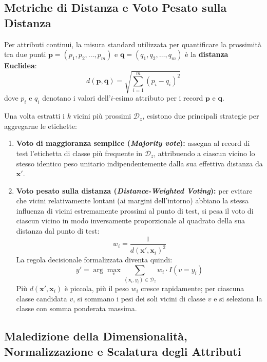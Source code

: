 \FloatBarrier
\subsection{Metriche di Distanza e Voto Pesato sulla Distanza}
\label{subsec:dm-knn-distance-weighting}

Per attributi continui, la misura standard utilizzata per quantificare la prossimit\`a tra due punti $\mathbf{p} = (p_1, p_2, \dots, p_m)$ e $\mathbf{q} = (q_1, q_2, \dots, q_m)$ \`e la \textbf{distanza Euclidea}:
\begin{equation}
    d(\mathbf{p}, \mathbf{q}) = \sqrt{\sum_{i=1}^{m} (p_i - q_i)^2}
\end{equation}
dove $p_i$ e $q_i$ denotano i valori dell'$i$-esimo attributo per i record $\mathbf{p}$ e $\mathbf{q}$.

Una volta estratti i $k$ vicini pi\`u prossimi $\mathcal{D}_z$, esistono due principali strategie per aggregarne le etichette:
\begin{enumerate}
    \item \textbf{Voto di maggioranza semplice (\textit{Majority vote}):} assegna al record di test l'etichetta di classe pi\`u frequente in $\mathcal{D}_z$, attribuendo a ciascun vicino lo stesso identico peso unitario indipendentemente dalla sua effettiva distanza da $\mathbf{x}'$.
    \item \textbf{Voto pesato sulla distanza (\textit{Distance-Weighted Voting}):} per evitare che vicini relativamente lontani (ai margini dell'intorno) abbiano la stessa influenza di vicini estremamente prossimi al punto di test, si pesa il voto di ciascun vicino in modo inversamente proporzionale al quadrato della sua distanza dal punto di test:
    \begin{equation}
        w_i = \frac{1}{d(\mathbf{x}', \mathbf{x}_i)^2}
    \end{equation}
    La regola decisionale formalizzata diventa quindi:
    \begin{equation}
        y' = \arg\max_{v} \sum_{(\mathbf{x}_i, y_i) \in \mathcal{D}_z} w_i \cdot I(v = y_i)
    \end{equation}
    Pi\`u $d(\mathbf{x}', \mathbf{x}_i)$ \`e piccola, pi\`u il peso $w_i$ cresce rapidamente; per ciascuna classe candidata $v$, si sommano i pesi dei soli vicini di classe $v$ e si seleziona la classe con somma ponderata massima.
\end{enumerate}

\FloatBarrier
\subsection{Maledizione della Dimensionalit\`a, Normalizzazione e Scalatura degli Attributi}
\label{subsec:dm-knn-scaling}

